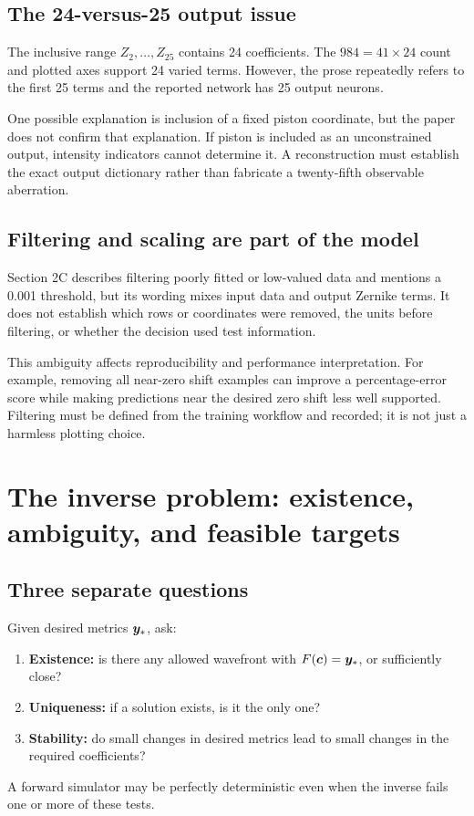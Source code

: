 \section{The 24-versus-25 output issue}
The inclusive range $Z_2,\ldots,Z_{25}$ contains 24 coefficients.
The $984=41\times24$ count and plotted axes support 24 varied terms.
However, the prose repeatedly refers to the first 25 terms and the
reported network has 25 output neurons.

One possible explanation is inclusion of a fixed piston coordinate,
but the paper does not confirm that explanation. If piston is included
as an unconstrained output, intensity indicators cannot determine it.
A reconstruction must establish the exact output dictionary rather
than fabricate a twenty-fifth observable aberration.

\section{Filtering and scaling are part of the model}
Section 2C describes filtering poorly fitted or low-valued data and
mentions a 0.001 threshold, but its wording mixes input data and
output Zernike terms. It does not establish which rows or coordinates
were removed, the units before filtering, or whether the decision used
test information.

This ambiguity affects reproducibility and performance interpretation.
For example, removing all near-zero shift examples can improve a
percentage-error score while making predictions near the desired zero
shift less well supported. Filtering must be defined from the training
workflow and recorded; it is not just a harmless plotting choice.

\chapter{The inverse problem: existence, ambiguity, and feasible targets}\label{ch:inverse}
\section{Three separate questions}
Given desired metrics $\bm{y}_*$, ask:
\begin{enumerate}
\item \textbf{Existence:} is there any allowed wavefront with
$F(\bm{c})=\bm{y}_*$, or sufficiently close?
\item \textbf{Uniqueness:} if a solution exists, is it the only one?
\item \textbf{Stability:} do small changes in desired metrics lead to
small changes in the required coefficients?
\end{enumerate}
A forward simulator may be perfectly deterministic even when the
inverse fails one or more of these tests.

